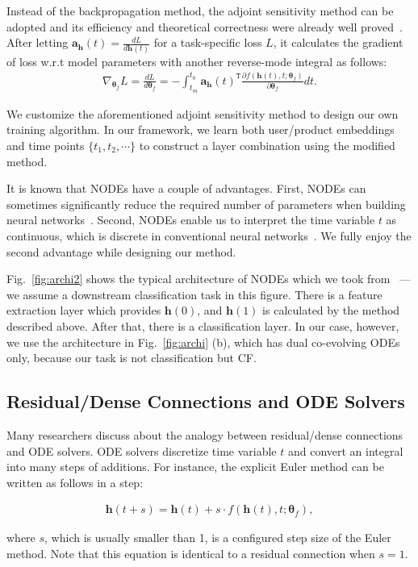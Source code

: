 \documentclass[sigconf]{acmart}
\begin{document}
Instead of the backpropagation method, the adjoint sensitivity method can be adopted and its efficiency and theoretical correctness were already well proved~\cite{NIPS2018_7892}. After letting $\bm{a}_{\bm{h}}(t) = \frac{d L}{d \bm{h}(t)}$ for a task-specific loss $L$, it calculates the gradient of loss w.r.t model parameters with another reverse-mode integral as follows:\begin{align*}\nabla_{\bm{\theta}_f} L = \frac{d L}{d \bm{\theta}_f} = -\int_{t_m}^{t_0} \bm{a}_{\bm{h}}(t)^{\mathtt{T}} \frac{\partial f(\bm{h}(t), t;\bm{\theta}_f)}{\partial \bm{\theta}_f} dt.\end{align*}

We customize the aforementioned adjoint sensitivity method to design our own training algorithm. In our framework, we learn both user/product embeddings and time points $\{t_1, t_2, \cdots\}$ to construct a layer combination using the modified method.

It is known that NODEs have a couple of advantages. First, NODEs can sometimes significantly reduce the required number of parameters when building neural networks~\cite{2019arXiv191010470P}. Second, NODEs enable us to interpret the time variable $t$ as continuous, which is discrete in conventional neural networks~\cite{NIPS2018_7892}. We fully enjoy the second advantage while designing our method.

Fig.~\ref{fig:archi2} shows the typical architecture of NODEs which we took from~\cite{NIPS2019_8577} --- we assume a downstream classification task in this figure. There is a feature extraction layer which provides $\bm{h}(0)$, and $\bm{h}(1)$ is calculated by the method described above. After that, there is a classification layer. In our case, however, we use the architecture in Fig.~\ref{fig:archi} (b), which has dual co-evolving ODEs only, because our task is not classification but CF.

\subsection{Residual/Dense Connections and ODE Solvers} Many researchers discuss about the analogy between residual/dense connections and ODE solvers. ODE solvers discretize time variable $t$ and convert an integral into many steps of additions. For instance, the explicit Euler method can be written as follows in a step:
\begin{linenomath*}\begin{align}\label{eq:euler}
\bm{h}(t + s) = \bm{h}(t) + s \cdot f(\bm{h}(t), t;\bm{\theta}_f),
\end{align}\end{linenomath*}where $s$, which is usually smaller than 1, is a configured step size of the Euler method. Note that this equation is identical to a residual connection when $s=1$.
\end{document}
